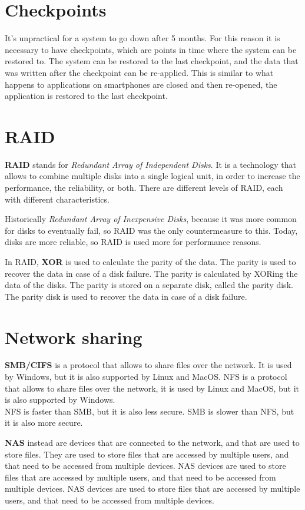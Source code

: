 \section{Checkpoints}
It's unpractical for a system to go down after 5 months. For this reason it is necessary to have checkpoints, which are points in time where the system can be restored to. The system can be restored to the last checkpoint, and the data that was written after the checkpoint can be re-applied. This is similar to what happens to applications on smartphones are closed and then re-opened, the application is restored to the last checkpoint.

\section{RAID}
\textbf{RAID} stands for \textit{Redundant Array of Independent Disks}. It is a technology that allows to combine multiple disks into a single logical unit, in order to increase the performance, the reliability, or both. There are different levels of RAID, each with different characteristics.

Historically \textit{Redundant Array of Inexpensive Disks}, because it was more common for disks to eventually fail, so RAID was the only countermeasure to this. Today, disks are more reliable, so RAID is used more for performance reasons.

In RAID, \textbf{XOR} is used to calculate the parity of the data. The parity is used to recover the data in case of a disk failure. The parity is calculated by XORing the data of the disks. The parity is stored on a separate disk, called the parity disk. The parity disk is used to recover the data in case of a disk failure.

\section{Network sharing}
\textbf{SMB/CIFS} is a protocol that allows to share files over the network. It is used by Windows, but it is also supported by Linux and MacOS. NFS is a protocol that allows to share files over the network, it is used by Linux and MacOS, but it is also supported by Windows.\\
NFS is faster than SMB, but it is also less secure. SMB is slower than NFS, but it is also more secure.

\textbf{NAS} instead are devices that are connected to the network, and that are used to store files. They are used to store files that are accessed by multiple users, and that need to be accessed from multiple devices. NAS devices are used to store files that are accessed by multiple users, and that need to be accessed from multiple devices. NAS devices are used to store files that are accessed by multiple users, and that need to be accessed from multiple devices.

